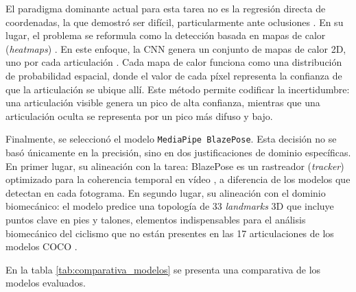 El paradigma dominante actual para esta tarea no es la regresión directa de
coordenadas, la que demostró ser difícil, particularmente ante oclusiones
\citep{ar5iv_heatmap_regression}. En su lugar, el problema se reformula como la
detección basada en mapas de calor (\textit{heatmaps})
\citep{medium_vanishing_point_heatmap}. En este enfoque, la CNN genera un
conjunto de mapas de calor 2D, uno por cada articulación
\citep{stackoverflow_parse_heatmap}. Cada mapa de calor funciona como una
distribución de probabilidad espacial, donde el valor de cada píxel representa
la confianza de que la articulación se ubique allí. Este método permite
codificar la incertidumbre: una articulación visible genera un pico de alta
confianza, mientras que una articulación oculta se representa por un pico más
difuso y bajo.

Finalmente, se seleccionó el modelo \texttt{MediaPipe BlazePose}. Esta decisión
no se basó únicamente en la precisión, sino en dos justificaciones de dominio
específicas. En primer lugar, su alineación con la tarea: BlazePose es un
rastreador (\textit{tracker}) optimizado para la coherencia temporal en
vídeo \citep{learnopencv_yolov7_vs_mediapipe}, a diferencia de los
modelos que detectan en cada fotograma. En segundo lugar, su alineación con el
dominio biomecánico: el modelo predice una topología de 33 \textit{landmarks}
3D \citep{googleai_pose_landmarker} que incluye puntos clave en pies y talones,
elementos indispensables para el análisis biomecánico del ciclismo que no están
presentes en las 17 articulaciones de los modelos COCO
\citep{learnopencv_keypoint_rcnn}.

En la tabla \ref{tab:comparativa_modelos} se presenta una comparativa de los
modelos evaluados.

